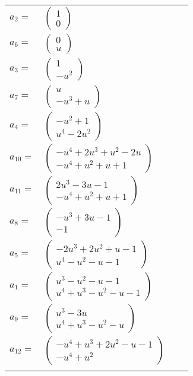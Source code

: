 \documentclass[1p]{elsarticle_modified}
\theoremstyle{definition}
\begin{document}
\begin{tabular}{m{7pt} m{180pt} m{7pt} m{180pt} }
\flushright $a_{2}=$&$\begin{pmatrix}1\\0\end{pmatrix}$ \\
\flushright $a_{6}=$&$\begin{pmatrix}0\\u\end{pmatrix}$ \\
\flushright $a_{3}=$&$\begin{pmatrix}1\\- u^2\end{pmatrix}$ \\
\flushright $a_{7}=$&$\begin{pmatrix}u\\- u^3+u\end{pmatrix}$ \\
\flushright $a_{4}=$&$\begin{pmatrix}- u^2+1\\u^4-2 u^2\end{pmatrix}$ \\
\flushright $a_{10}=$&$\begin{pmatrix}- u^4+2 u^3+u^2-2 u\\- u^4+u^2+u+1\end{pmatrix}$ \\
\flushright $a_{11}=$&$\begin{pmatrix}2 u^3-3 u-1\\- u^4+u^2+u+1\end{pmatrix}$ \\
\flushright $a_{8}=$&$\begin{pmatrix}- u^3+3 u-1\\-1\end{pmatrix}$ \\
\flushright $a_{5}=$&$\begin{pmatrix}-2 u^3+2 u^2+u-1\\u^4- u^2- u-1\end{pmatrix}$ \\
\flushright $a_{1}=$&$\begin{pmatrix}u^3- u^2- u-1\\u^4+u^3- u^2- u-1\end{pmatrix}$ \\
\flushright $a_{9}=$&$\begin{pmatrix}u^3-3 u\\u^4+u^3- u^2- u\end{pmatrix}$ \\
\flushright $a_{12}=$&$\begin{pmatrix}- u^4+u^3+2 u^2- u-1\\- u^4+u^2\end{pmatrix}$\\&\end{tabular}
\end{document}
